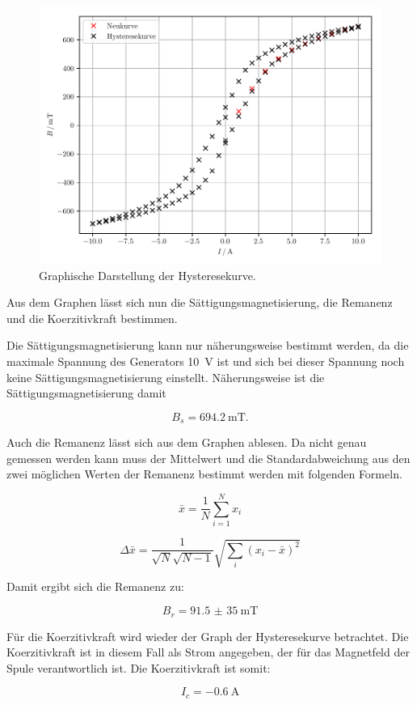 \begin{figure}[H]
  \centering
  \includegraphics{plot6.pdf}
  \caption{Graphische Darstellung der Hysteresekurve.}
  \label{abb:12}
\end{figure}

Aus dem Graphen lässt sich nun die Sättigungsmagnetisierung, die Remanenz und die
Koerzitivkraft bestimmen.

Die Sättigungsmagnetisierung kann nur näherungsweise bestimmt werden, da die
maximale Spannung des Generators \SI{10}{\volt} ist und sich bei dieser Spannung noch
keine Sättigungsmagnetisierung einstellt. Näherungsweise ist die Sättigungsmagnetisierung
damit

\begin{equation*}
  B_s = \SI{694.2}{\milli\tesla}.
\end{equation*}

Auch die Remanenz lässt sich aus dem Graphen ablesen. Da nicht genau gemessen werden
kann muss der Mittelwert und die Standardabweichung aus den zwei möglichen Werten der Remanenz bestimmt werden
mit folgenden Formeln.

\begin{equation}
    \bar{x} = \frac{1}{N} \sum_{i=1}^{N} x_i
\end{equation}

\begin{equation}
  \Delta \bar{x} = \frac{1}{\sqrt{N}\sqrt{N-1}} \sqrt{\sum_{i}(x_i-\bar{x})^2}
\end{equation}

Damit ergibt sich die Remanenz zu:

\begin{equation*}
  B_r = \SI{91.5(350)}{\milli\tesla}
\end{equation*}

Für die Koerzitivkraft wird wieder der Graph der Hysteresekurve betrachtet. Die
Koerzitivkraft ist in diesem Fall als Strom angegeben, der für das Magnetfeld der
Spule verantwortlich ist. Die Koerzitivkraft ist somit:

\begin{equation*}
  I_c = \SI{-0.6}{\ampere}
\end{equation*}
